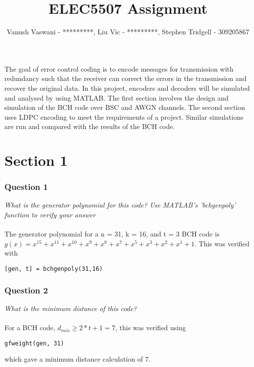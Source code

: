 \documentclass[a4paper]{article}
\begin{document}
\title{ELEC5507 Assignment}
\author{Vanush Vaswani - *********, Liu Vic - *********, Stephen Tridgell - 309205867}

\maketitle


\lstset{language=Matlab}

The goal of error control coding is to encode messages for transmission with redundancy such that the receiver can correct the errors in the transmission and recover the original data. In this project, encoders and decoders will be simulated and analysed by using MATLAB. The first section involves the design and simulation of the BCH code over BSC and AWGN channels. The second section uses LDPC encoding to meet the requirements of a project. Similar simulations are run and compared with the results of the BCH code.

\section*{Section 1}

\subsubsection*{Question 1} \textit{What is the generator polynomial for this code? Use MATLAB’s ’bchgenpoly’ function to verify your answer} \\
\\
The generator polynomial for a n = 31, k = 16, and t = 3 BCH code is $g(x) = x^{15} + x^{11} + 
x^{10} + x^{9} + x^{8} + x^{7} + x^{5} + x^{3} + x^{2} + x^{1} + 1$. 
This was verified with 
\begin{lstlisting}
[gen, t] = bchgenpoly(31,16)
\end{lstlisting}

\subsubsection*{Question 2} \textit{What is the minimum distance of this code?} \\
\\
For a BCH code, $d_{min} \geq 2*t + 1 = 7$, this was verified using 
\begin{lstlisting}
gfweight(gen, 31)
\end{lstlisting}
which gave a minimum distance calculation of 7.
\end{document}
